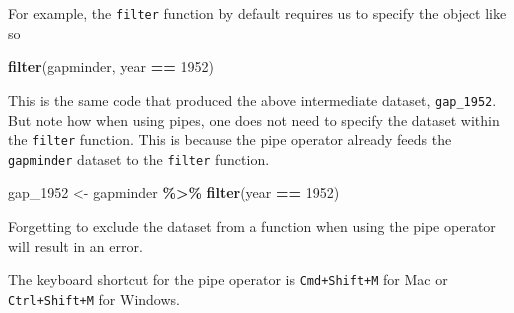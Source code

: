 \documentclass[
]{book}
\makeatletter
\newenvironment{Shaded}{\begin{snugshade}}{\end{snugshade}}
\newcommand{\AttributeTok}[1]{\textcolor[rgb]{0.27,0.27,0.27}{#1}}
\newcommand{\DecValTok}[1]{\textcolor[rgb]{0.06,0.06,0.06}{#1}}
\newcommand{\FunctionTok}[1]{\textcolor[rgb]{0.27,0.27,0.27}{\textbf{#1}}}
\newcommand{\NormalTok}[1]{#1}
\newcommand{\OtherTok}[1]{\textcolor[rgb]{0.37,0.37,0.37}{#1}}
\newcommand{\SpecialCharTok}[1]{\textcolor[rgb]{0.43,0.43,0.43}{\textbf{#1}}}
\newcommand{\StringTok}[1]{\textcolor[rgb]{0.5,0.5,0.5}{#1}}
\newenvironment{kframe}{%
\medskip{}
\setlength{\fboxsep}{.8em}
 \def\at@end@of@kframe{}%
 \ifinner\ifhmode%
  \def\at@end@of@kframe{\end{minipage}}%
  \begin{minipage}{\columnwidth}%
 \fi\fi%
 \def\FrameCommand##1{\hskip\@totalleftmargin \hskip-\fboxsep
 \colorbox{shadecolor}{##1}\hskip-\fboxsep
     \hskip-\linewidth \hskip-\@totalleftmargin \hskip\columnwidth}%
 \MakeFramed {\advance\hsize-\width
   \@totalleftmargin\z@ \linewidth\hsize
   \@setminipage}}%
 {\par\unskip\endMakeFramed%
 \at@end@of@kframe}
\renewenvironment{Shaded}{\begin{kframe}}{\end{kframe}}
\makeatother
\begin{document}
For example, the \texttt{filter} function by default requires us to specify the object like so

\begin{Shaded}
\begin{Highlighting}[]
\FunctionTok{filter}\NormalTok{(gapminder, year }\SpecialCharTok{==} \DecValTok{1952}\NormalTok{)}
\end{Highlighting}
\end{Shaded}

This is the same code that produced the above intermediate dataset, \texttt{gap\_1952}. But note how when using pipes, one does not need to specify the dataset within the \texttt{filter} function. This is because the pipe operator already feeds the \texttt{gapminder} dataset to the \texttt{filter} function.

\begin{Shaded}
\begin{Highlighting}[]
\NormalTok{gap\_1952 }\OtherTok{\textless{}{-}}\NormalTok{ gapminder }\SpecialCharTok{\%\textgreater{}\%} 
  \FunctionTok{filter}\NormalTok{(year }\SpecialCharTok{==} \DecValTok{1952}\NormalTok{)}
\end{Highlighting}
\end{Shaded}

Forgetting to exclude the dataset from a function when using the pipe operator will result in an error.

\begin{Shaded}
\end{Shaded}

The keyboard shortcut for the pipe operator is \texttt{Cmd+Shift+M} for Mac or \texttt{Ctrl+Shift+M} for Windows.
\end{document}
